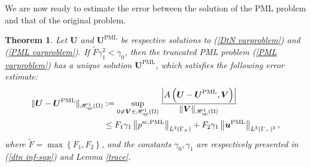 \documentclass[final,3p,times]{elsarticle}
\newtheorem{theorem}{Theorem}%
\begin{document}
We are now ready to estimate the error between the solution of the PML problem and that of the original problem.
\begin{theorem}\label{theorem1}
	Let $\boldsymbol{U}$ and $\boldsymbol{U}^{\mathrm{PML}}$ be respective solutions to (\ref{DtN varproblem}) and (\ref{PML varproblem}). If $\widetilde{F}\gamma_1^2<\gamma_0$, then the truncated PML  problem (\ref{PML varproblem}) has a unique solution $\boldsymbol{U}^{\mathrm{PML}}$, which satisfies the following error estimate:
	\begin{align}\label{4.7}
		\|\boldsymbol{U}-\boldsymbol{U}^{\mathrm{PML}}\|_{\mathscr{H}^1_\mathrm{qp}(\Omega)}&:=\sup _{0 \neq \boldsymbol{V} \in \mathscr{H}^1_\mathrm{qp}(\Omega)} \frac{\left|A\left(\boldsymbol{U}-\boldsymbol{U}^{\mathrm{PML}}, \boldsymbol{V}\right)\right|}{\|\boldsymbol{V}\|_{\mathscr{H}^1_\mathrm{qp}(\Omega)}} \notag\\ &\leq 
		F_1\gamma_1\left\|p^{\mathrm{sc},\mathrm{PML}}\right\|_{L^2(\Gamma_+)}+F_2\gamma_1\left\|\boldsymbol{u}^{\mathrm{PML}}\right\|_{L^2(\Gamma_-)^2},
	\end{align}
	where $\widetilde{F}=\max\left\{F_1, F_2\right\}$, and the constants $\gamma_0, \gamma_1$ are respectively presented in  (\ref{dtn inf-sup}) and Lemma \ref{trace}.
\end{theorem}
\end{document}
